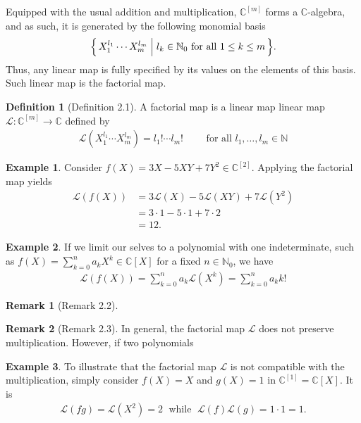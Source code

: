 \documentclass[a4paper]{article}
\theoremstyle{definition}
\newtheorem{definition}{Definition}[]
\newtheorem{example}{Example}[definition]
\newtheorem*{remark}{Remark}
\newcommand{\makeset}[2]{\mleft\{\, #1 \; \middle| \; #2 \,\mright\}}
\begin{document}
Equipped with the usual addition and multiplication, \(\mathbb{C}^{[m]}\) forms a \(\mathbb{C}\)-algebra, and as such, it is generated by the following monomial basis
%
\begin{align*}
    \makeset{X_1^{l_1} \cdots X_m^{l_m}}{l_k \in \mathbb{N}_0 \text{ for all } 1 \leq k \leq m} \text{.}
\end{align*}
%
Thus, any linear map is fully specified by its values on the elements of this basis. Such linear map is the factorial map.
%
\begin{definition}[Definition 2.1]
    A factorial map is a linear map linear map \(\mathcal{L}: \mathbb{C}^{[m]} \longrightarrow \mathbb{C}\) defined by
    \begin{align*}
        \mathcal{L}(X_1^{l_1} \cdots X_m^{l_m}) = l_1! \cdots l_m! \qquad \text{ for all } l_1, \ldots, l_m \in \mathbb{N}
    \end{align*}
\end{definition}
%
\begin{example}
    Consider \(f(X) = 3X - 5XY + 7Y^2 \in \mathbb{C}^{[2]}\). Applying the factorial map yields
    \begin{align*}
        \mathcal{L}(f(X)) &= 3\mathcal{L}(X) - 5 \mathcal{L}(XY) + 7 \mathcal{L}(Y^2) \\
        &= 3 \cdot 1 - 5 \cdot 1 + 7 \cdot 2 \\
        &= 12 \text{.}
    \end{align*}
\end{example}
%
\begin{example}
    If we limit our selves to a polynomial with one indeterminate, such as \(f(X) = \sum_{k = 0}^n a_k X^k \in \mathbb{C}[X]\) for a fixed \(n \in \mathbb{N}_0\), we have
    \begin{align*}
        \mathcal{L}(f(X)) = \sum_{k = 0}^n a_k \mathcal{L}(X^k) = \sum_{k=0}^n a_k k!
    \end{align*}
\end{example}
%
\begin{remark}[Remark 2.2]
    
\end{remark}
%
\begin{remark}[Remark 2.3]
    In general, the factorial map \(\mathcal{L}\) does not preserve multiplication. However, if two polynomials
\end{remark}
%
\begin{example}
    To illustrate that the factorial map \(\mathcal{L}\) is not compatible with the multiplication, simply consider \(f(X) = X\) and \(g(X) = 1\) in \(\mathbb{C}^{[1]} = \mathbb{C}[X]\). It is
    \begin{align*}
        \mathcal{L}(fg) = \mathcal{L}(X^2) = 2 \;\text{ while } \;\mathcal{L}(f) \mathcal{L}(g) = 1 \cdot 1 = 1 \text{.}
    \end{align*}
\end{example}
\end{document}
